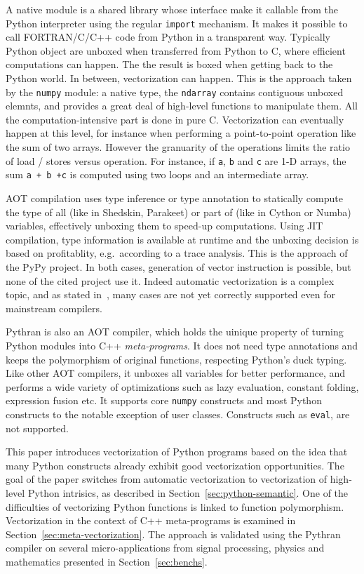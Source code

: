 \documentclass[preprint]{sigplanconf}
\begin{document}
A native module is a shared library whose interface make it callable from the
Python interpreter using the regular \texttt{import} mechanism. It makes it
possible to call FORTRAN/C/C++ code from Python in a transparent way. Typically
Python object are unboxed when transferred from Python to C, where efficient
computations can happen. The the result is boxed when getting back to the
Python world. In between, vectorization can happen.  This is the approach taken
by the \texttt{numpy} module: a native type, the \texttt{ndarray} contains
contiguous unboxed elemnts, and provides a great deal of high-level functions
to manipulate them. All the computation-intensive part is done in pure C.
Vectorization can eventually happen at this level, for instance when performing
a point-to-point operation like the sum of two arrays.  However the granuarity
of the operations limits the ratio of load / stores versus operation. For
instance, if \texttt{a}, \texttt{b} and \texttt{c} are 1-D arrays, the sum
\texttt{a + b +c} is computed using two loops and an intermediate array.

AOT compilation uses type inference or type annotation to statically compute
the type of all (like in Shedskin, Parakeet) or part of (like in Cython or
Numba) variables, effectively unboxing them to speed-up computations. Using JIT
compilation, type information is available at runtime and the unboxing decision
is based on profitablity, e.g.\ according to a trace analysis. This is the
approach of the PyPy project. In both cases, generation of vector instruction
is possible, but none of the cited project use it.  Indeed automatic
vectorization is a complex topic, and as stated in~\cite{maleki2011}, many cases
are not yet correctly supported even for mainstream compilers.

Pythran is also an AOT compiler, which holds the uinique property of turning
Python modules into C++ \emph{meta-programs}. It does not need type annotations
and keeps the polymorphism of original functions, respecting Python's duck
typing. Like other AOT compilers, it unboxes all variables for better
performance, and performs a wide variety of optimizations such as lazy
evaluation, constant folding, expression fusion etc.  It supports core
\texttt{numpy} constructs and most Python constructs to the notable exception
of user classes. Constructs such as \texttt{eval}, are not supported.

This paper introduces vectorization of Python programs based on the idea that
many Python constructs already exhibit good vectorization opportunities. The
goal of the paper switches from automatic vectorization to vectorization of
high-level Python intrisics, as described in Section~\ref{sec:python-semantic}.
One of the difficulties of vectorizing Python functions is linked to function
polymorphism. Vectorization in the context of C++ meta-programs is examined in
Section~\ref{sec:meta-vectorization}. The approach is validated using the
Pythran compiler on several micro-applications from signal processing, physics
and mathematics presented in Section~\ref{sec:benchs}.
\end{document}
